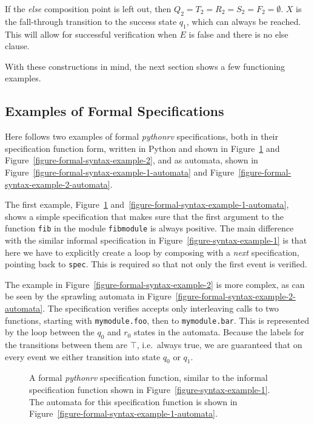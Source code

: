 \documentclass[a4paper,11pt]{kth-mag}
\begin{document}
If the \textit{else} composition point is left out, then $Q_2 = T_2 = R_2 = S_2
= F_2 = \emptyset$. $X$ is the fall-through transition to the success state
$q_1$, which can always be reached. This will allow for successful verification
when $E$ is false and there is no else clause.

With these constructions in mind, the next section shows a few functioning
examples.


\subsection{Examples of Formal Specifications}
\label{section-approach-examples-of-formal-specifications}
\lstset{language=Python,numbers=none}

Here follows two examples of formal \textit{pythonrv} specifications, both in
their specification function form, written in Python and shown in
Figure~\ref{figure-formal-syntax-example-1} and
Figure~\ref{figure-formal-syntax-example-2}, and as automata, shown in
Figure~\ref{figure-formal-syntax-example-1-automata} and
Figure~\ref{figure-formal-syntax-example-2-automata}.

The first example, Figure~\ref{figure-formal-syntax-example-1}
and~\ref{figure-formal-syntax-example-1-automata}, shows a simple specification
that makes sure that the first argument to the function \texttt{fib} in the
module \texttt{fibmodule} is always positive. The main difference with the
similar informal specification in Figure~\ref{figure-syntax-example-1} is that
here we have to explicitly create a loop by composing with a \textit{next}
specification, pointing back to \texttt{spec}. This is required so that not
only the first event is verified.

The example in Figure~\ref{figure-formal-syntax-example-2} is more complex, as
can be seen by the sprawling automata in
Figure~\ref{figure-formal-syntax-example-2-automata}. The specification
verifies accepts only interleaving calls to two functions, starting with
\texttt{mymodule.foo}, then to
\texttt{mymodule.bar}. This is represented by the loop between the $q_0$ and
$r_0$ states in the automata. Because the labels for the transitions between
them are $\top$, i.e.\ always true, we are guaranteed that on every event we
either transition into state $q_0$ or $q_1$.


\begin{figure}[h!]
	\begin{center}
	\begin{minipage}{0.9\textwidth}
	
	\end{minipage}
	\end{center}

  \caption{A formal \textit{pythonrv} specification function, similar to the
    informal specification function shown in
    Figure~\ref{figure-syntax-example-1}. The automata for this specification
    function is shown in Figure~\ref{figure-formal-syntax-example-1-automata}.}
	\label{figure-formal-syntax-example-1}
\end{figure}
\end{document}
